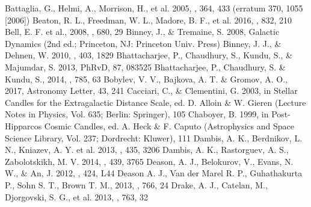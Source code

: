 \documentclass[12pt,preprint]{aastex}
\begin{document}
%
%

\begin{thebibliography}{99}

Battaglia, G., Helmi, A., Morrison, H., et al. 2005,
\mnras, 364, 433 (erratum 370, 1055 [2006])
Beaton, R. L., Freedman, W. L., Madore, B. F., et al. 2016, \apj, 832, 210
Bell, E. F. et al., 2008, \apj, 680, 29
Binney, J., \& Tremaine, S. 2008, Galactic Dynamics (2nd ed.; Princeton, NJ:
Princeton Univ. Press)
Binney, J. J., \& Dehnen, W. 2010, \mnras, 403, 1829
Bhattacharjee, P., Chaudhury, S., Kundu, S., \& Majumdar, S. 2013,
PhRvD, 87, 083525
Bhattacharjee, P., Chaudhury, S. \& Kundu, S., 2014, \apj, 785, 63
Bobylev, V. V., Bajkova, A. T. \& Gromov, A. O., 2017, Astronomy Letter, 43, 241
Cacciari, C., \& Clementini, G. 2003, in Stellar Candles for the Extragalactic
Distance Scale, ed. D. Alloin \& W. Gieren (Lecture Notes in Physics, Vol.
635; Berlin: Springer), 105
Chaboyer, B. 1999, in Post-Hipparcos Cosmic Candles, ed. A. Heck \& F. Caputo
(Astrophysics and Space Science Library, Vol. 237; Dordrecht: Kluwer), 111
Dambis, A. K., Berdnikov, L. N., Kniazev, A. Y. et al. 2013, \mnras, 435, 3206
Dambis, A. K., Rastorguev, A. S., Zabolotskikh, M. V. 2014, \mnras, 439, 3765
Deason, A. J., Belokurov, V., Evans, N. W., \& An, J. 2012, \mnras, 424, L44
Deason A. J., Van der Marel R. P., Guhathakurta P., Sohn S. T., Brown
T. M., 2013, \apj, 766, 24
Drake, A. J., Catelan, M., Djorgovski, S. G., et al. 2013, \apj, 763, 32

\end{thebibliography}
\end{document}
